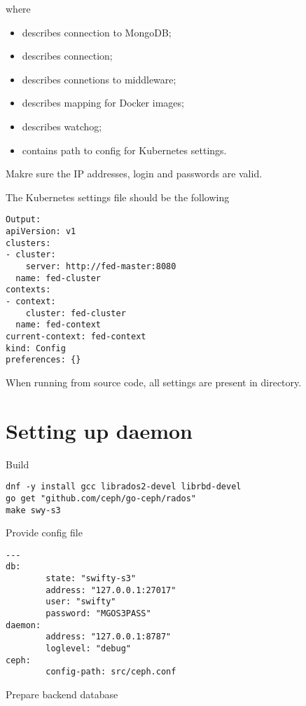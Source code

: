 where
\begin{itemize}
\item{ describes connection to MongoDB;}
\item{ describes  connection;}
\item{ describes connetions to middleware;}
\item{ describes mapping for Docker images;}
\item{ describes  watchog;}
\item{ contains path to config for Kubernetes settings.}
\end{itemize}

Makre sure the IP addresses, login and passwords are valid.

The Kubernetes settings file should be the following

\begin{lstlisting}
Output:
apiVersion: v1
clusters:
- cluster:
    server: http://fed-master:8080
  name: fed-cluster
contexts:
- context:
    cluster: fed-cluster
  name: fed-context
current-context: fed-context
kind: Config
preferences: {}
\end{lstlisting}

When running from  source code, all settings are present
in  directory.

\section{Setting up  daemon}
\label{sec:setup-swy-s3}

Build 

\begin{lstlisting}
dnf -y install gcc librados2-devel librbd-devel
go get "github.com/ceph/go-ceph/rados"
make swy-s3
\end{lstlisting}

Provide config file 

\begin{lstlisting}
---
db:
        state: "swifty-s3"
        address: "127.0.0.1:27017"
        user: "swifty"
        password: "MGOS3PASS"
daemon:
        address: "127.0.0.1:8787"
        loglevel: "debug"
ceph:
        config-path: src/ceph.conf
\end{lstlisting}

Prepare backend database


